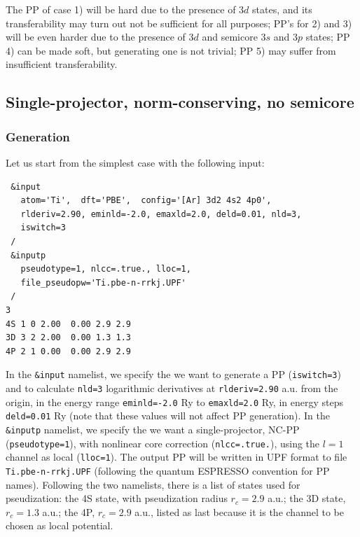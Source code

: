 \documentclass[12pt,a4paper]{article}
\begin{document}
The PP of case 1) will be hard due to the presence of $3d$ states, and 
its transferability may turn out not be sufficient for all purposes;
PP's for 2) and 3) will be even harder due to the presence of $3d$ and
semicore $3s$ and $3p$ states; PP 4) can be made soft, but generating
one is not trivial; PP 5) may suffer from insufficient transferability.

\subsection {Single-projector, norm-conserving, no semicore}

\subsubsection{Generation}
Let us start from the simplest case with the following input:
\begin{verbatim}
 &input
   atom='Ti',  dft='PBE',  config='[Ar] 3d2 4s2 4p0',
   rlderiv=2.90, eminld=-2.0, emaxld=2.0, deld=0.01, nld=3,
   iswitch=3
 /
 &inputp
   pseudotype=1, nlcc=.true., lloc=1,
   file_pseudopw='Ti.pbe-n-rrkj.UPF'
 /
3
4S 1 0 2.00  0.00 2.9 2.9
3D 3 2 2.00  0.00 1.3 1.3
4P 2 1 0.00  0.00 2.9 2.9
\end{verbatim}
In the \texttt{\&input} namelist,
we specify the we want to generate a PP (\texttt{iswitch=3}) and to
calculate \texttt{nld=3} logarithmic derivatives at \texttt{rlderiv=2.90} a.u.
from the origin, in the energy range \texttt{eminld=-2.0} Ry to 
\texttt{emaxld=2.0} Ry, in energy steps \texttt{deld=0.01} Ry
(note that these values will not affect PP generation).
In the \texttt{\&inputp} namelist, we specify the we want a single-projector,
NC-PP (\texttt{pseudotype=1}), with nonlinear core correction 
(\texttt{nlcc=.true.}), using the $l=1$ channel as local (\texttt{lloc=1}).
The output PP will be written in UPF format to file \texttt{Ti.pbe-n-rrkj.UPF}
(following the {\sc quantum ESPRESSO} convention for PP names).
Following the two namelists, there is a list of states used for pseudization:
the 4S state, with pseudization radius $r_c=2.9$ a.u.; the 3D state,
 $r_c=1.3$ a.u.; the 4P, $r_c=2.9$ a.u.,  listed as last because it is
the channel to be chosen as local potential.
\end{document}
